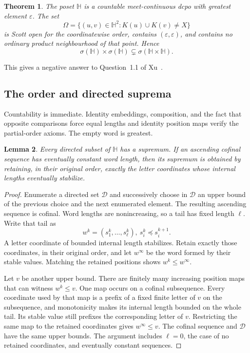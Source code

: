 \documentclass[fleqn,preprint,3p,a4paper]{elsarticle}
\newtheorem{theorem}{Theorem}[section]
\newtheorem{lemma}[theorem]{Lemma}
\theoremstyle{definition}
\newcommand{\HH}{\mathbb H}
\begin{document}
\begin{theorem}\label{word:thm:main}
The poset $\HH$ is a countable meet-continuous dcpo with greatest element $\varepsilon$. The set
\begin{equation}\label{word:eq:Omega}
 \Omega=\{(u,v)\in\HH^2:K(u)\cup K(v)\neq X\}
\end{equation}
is Scott open for the coordinatewise order, contains $(\varepsilon,\varepsilon)$, and contains no ordinary product neighbourhood of that point. Hence
\[
 \sigma(\HH)\times\sigma(\HH)
 \subsetneq
 \sigma(\HH\times\HH).
\]
\end{theorem}
This gives a negative answer to Question~1.1 of Xu~\cite{Xu}.

\subsection{The order and directed suprema}
Countability is immediate. Identity embeddings, composition, and the fact that opposite comparisons force equal lengths and identity position maps verify the partial-order axioms. The empty word is greatest.

\begin{lemma}\label{word:lem:sup}
Every directed subset of $\HH$ has a supremum. If an ascending cofinal sequence has eventually constant word length, then its supremum is obtained by retaining, in their original order, exactly the letter coordinates whose internal lengths eventually stabilize.
\end{lemma}
\begin{proof}
Enumerate a directed set $\mathcal D$ and successively choose in $\mathcal D$ an upper bound of the previous choice and the next enumerated element. The resulting ascending sequence is cofinal. Word lengths are nonincreasing, so a tail has fixed length $\ell$. Write that tail as
\[
 w^k=(s_1^k,\ldots,s_\ell^k),
 ~
 s_i^k\preceq s_i^{k+1}.
\]
A letter coordinate of bounded internal length stabilizes. Retain exactly those coordinates, in their original order, and let $w^\infty$ be the word formed by their stable values. Matching the retained positions shows $w^k\leq w^\infty$.

Let $v$ be another upper bound. There are finitely many increasing position maps that can witness $w^k\leq v$. One map occurs on a cofinal subsequence. Every coordinate used by that map is a prefix of a fixed finite letter of $v$ on the subsequence, and monotonicity makes its internal length bounded on the whole tail. Its stable value still prefixes the corresponding letter of $v$. Restricting the same map to the retained coordinates gives $w^\infty\leq v$. The cofinal sequence and $\mathcal D$ have the same upper bounds. The argument includes $\ell=0$, the case of no retained coordinates, and eventually constant sequences.
\end{proof}
\end{document}
